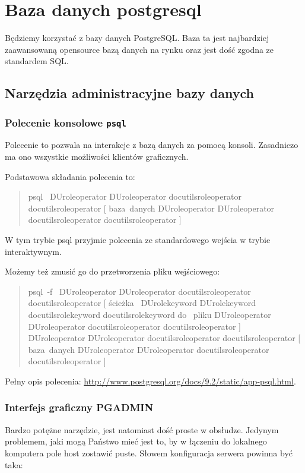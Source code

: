 \documentclass[a4paper]{article}
\providecommand*{\DUrole}[2]{%
  \ifcsname DUrole#1\endcsname%
    \csname DUrole#1\endcsname{#2}%
  \else%
    \ifcsname docutilsrole#1\endcsname%
      \csname docutilsrole#1\endcsname{#2}%
    \else%
      #2%
    \fi%
  \fi%
}
\begin{document}
\section{Baza danych postgresql%
  \label{baza-danych-postgresql}%
}

Będziemy korzystać z bazy danych PostgreSQL. Baza ta jest najbardziej
zaawansowaną opensource bazą danych na rynku oraz jest dość zgodna
ze standardem SQL.


\subsection{Narzędzia administracyjne bazy danych%
  \label{narzedzia-administracyjne-bazy-danych}%
}


\subsubsection{Polecenie konsolowe \texttt{psql}%
  \label{polecenie-konsolowe-psql}%
}

Polecenie to pozwala na interakcje z bazą danych za pomocą
konsoli. Zasadniczo ma ono wszystkie możliwości klientów
graficznych.

Podstawowa składania polecenia to:
%
\begin{quote}{\ttfamily \raggedright \noindent
psql~\DUrole{operator}{{[}}baza~danych\DUrole{operator}{{]}}
}
\end{quote}

W tym trybie psql przyjmie polecenia ze standardowego wejścia
w trybie interaktywnym.

Możemy też zmusić go do przetworzenia pliku wejściowego:
%
\begin{quote}{\ttfamily \raggedright \noindent
psql~-f~\DUrole{operator}{{[}}ścieżka~\DUrole{keyword}{do}~pliku\DUrole{operator}{{]}}~\DUrole{operator}{{[}}baza~danych\DUrole{operator}{{]}}
}
\end{quote}

Pełny opis polecenia: \url{http://www.postgresql.org/docs/9.2/static/app-psql.html}.


\subsubsection{Interfejs graficzny PGADMIN%
  \label{interfejs-graficzny-pgadmin}%
}

Bardzo potężne narzędzie, jest natomiast dość proste w obsłudze.
Jedynym problemem, jaki mogą Państwo mieć jest to, by w łączeniu
do lokalnego komputera pole host zostawić puste.
Słowem  konfiguracja serwera powinna być taka:
\end{document}

